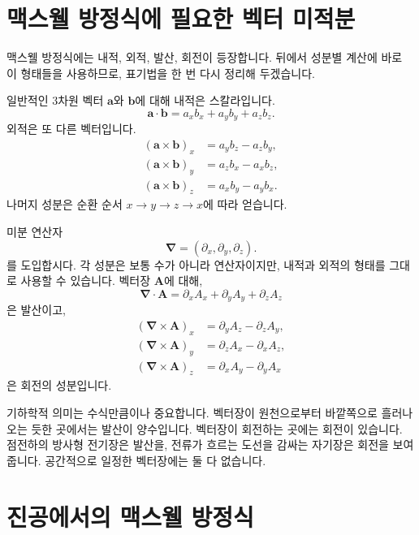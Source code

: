 \section{맥스웰 방정식에 필요한 벡터 미적분}

맥스웰 방정식에는 내적, 외적, 발산, 회전이 등장합니다. 뒤에서 성분별 계산에 바로 이 형태들을 사용하므로, 표기법을 한 번 다시 정리해 두겠습니다.

일반적인 3차원 벡터 \(\mathbf a\)와 \(\mathbf b\)에 대해 내적은 스칼라입니다.
\begin{equation}
\mathbf a\cdot\mathbf b
=a_xb_x+a_yb_y+a_zb_z.
\end{equation}
외적은 또 다른 벡터입니다.
\begin{align}
(\mathbf a\times\mathbf b)_x&=a_yb_z-a_zb_y,\\
(\mathbf a\times\mathbf b)_y&=a_zb_x-a_xb_z,\\
(\mathbf a\times\mathbf b)_z&=a_xb_y-a_yb_x.
\end{align}
나머지 성분은 순환 순서 \(x\to y\to z\to x\)에 따라 얻습니다.

미분 연산자
\begin{equation}
\boldsymbol\nabla=
\left(\partial_x,\partial_y,\partial_z\right).
\end{equation}
를 도입합시다. 각 성분은 보통 수가 아니라 연산자이지만, 내적과 외적의 형태를 그대로 사용할 수 있습니다. 벡터장 \(\mathbf A\)에 대해,
\begin{equation}
\boldsymbol\nabla\cdot\mathbf A
=\partial_xA_x+\partial_yA_y+\partial_zA_z
\label{eq:divergence}
\end{equation}
은 발산이고,
\begin{align}
(\boldsymbol\nabla\times\mathbf A)_x
 &=\partial_yA_z-\partial_zA_y,\\
(\boldsymbol\nabla\times\mathbf A)_y
 &=\partial_zA_x-\partial_xA_z,\\
(\boldsymbol\nabla\times\mathbf A)_z
 &=\partial_xA_y-\partial_yA_x
\label{eq:curl}
\end{align}
은 회전의 성분입니다.

기하학적 의미는 수식만큼이나 중요합니다. 벡터장이 원천으로부터 바깥쪽으로 흘러나오는 듯한 곳에서는 발산이 양수입니다. 벡터장이 회전하는 곳에는 회전이 있습니다. 점전하의 방사형 전기장은 발산을, 전류가 흐르는 도선을 감싸는 자기장은 회전을 보여 줍니다. 공간적으로 일정한 벡터장에는 둘 다 없습니다.

\section{진공에서의 맥스웰 방정식}

